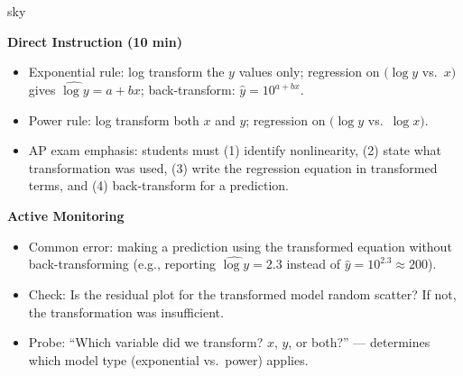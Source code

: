 \documentclass[10pt]{article}
\begin{document}
\begin{skillbox}{sky}
\begin{minipage}[t]{0.48\linewidth}
    \textbf{Direct Instruction (10 min)}
    \begin{itemize}
        \item Exponential rule: log transform the $y$ values only; regression on $(\log y$ vs.\ $x)$ gives $\widehat{\log y} = a + bx$; back-transform: $\hat{y} = 10^{a+bx}$.
        \item Power rule: log transform both $x$ and $y$; regression on $(\log y$ vs.\ $\log x)$.
        \item AP exam emphasis: students must (1) identify nonlinearity, (2) state what transformation was used, (3) write the regression equation in transformed terms, and (4) back-transform for a prediction.
    \end{itemize}
\end{minipage}
\hfill
\begin{minipage}[t]{0.48\linewidth}
    \textbf{Active Monitoring}
    \begin{itemize}
        \item Common error: making a prediction using the transformed equation without back-transforming (e.g., reporting $\widehat{\log y} = 2.3$ instead of $\hat{y} = 10^{2.3} \approx 200$).
        \item Check: Is the residual plot for the transformed model random scatter? If not, the transformation was insufficient.
        \item Probe: ``Which variable did we transform? $x$, $y$, or both?'' --- determines which model type (exponential vs.\ power) applies.
    \end{itemize}
\end{minipage}
\end{skillbox}
\end{document}
